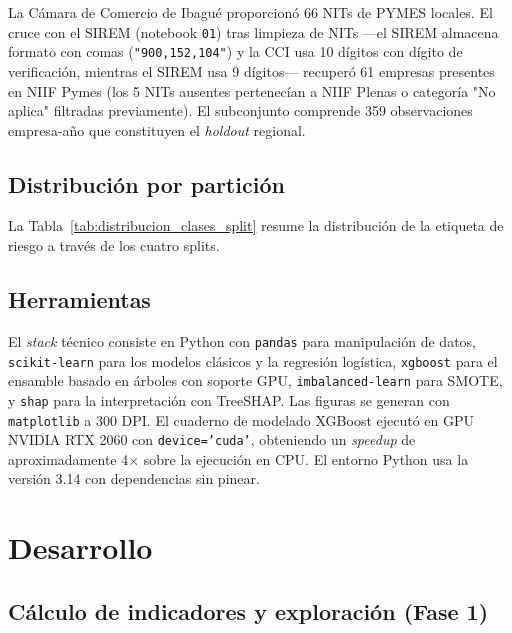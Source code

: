 \documentclass[12pt, letterpaper]{article}
\begin{document}
La C\'amara de Comercio de Ibagu\'e proporcion\'o 66 NITs de PYMES locales. El cruce con el SIREM (notebook \texttt{01}) tras limpieza de NITs ---el SIREM almacena formato con comas (\texttt{"900,152,104"}) y la CCI usa 10 d\'igitos con d\'igito de verificaci\'on, mientras el SIREM usa 9 d\'igitos--- recuper\'o 61 empresas presentes en NIIF Pymes (los 5 NITs ausentes pertenec\'ian a NIIF Plenas o categor\'ia "No aplica" filtradas previamente). El subconjunto comprende 359 observaciones empresa-a\~no que constituyen el \textit{holdout} regional.

\subsection{Distribuci\'on por partici\'on}

La Tabla~\ref{tab:distribucion_clases_split} resume la distribuci\'on de la etiqueta de riesgo a trav\'es de los cuatro splits.



\subsection{Herramientas}

El \textit{stack} t\'ecnico consiste en Python con \texttt{pandas} para manipulaci\'on de datos, \texttt{scikit-learn} para los modelos cl\'asicos y la regresi\'on log\'istica, \texttt{xgboost} para el ensamble basado en \'arboles con soporte GPU, \texttt{imbalanced-learn} para SMOTE, y \texttt{shap} para la interpretaci\'on con TreeSHAP. Las figuras se generan con \texttt{matplotlib} a 300 DPI. El cuaderno de modelado XGBoost ejecut\'o en GPU NVIDIA RTX 2060 con \texttt{device='cuda'}, obteniendo un \textit{speedup} de aproximadamente 4$\times$ sobre la ejecuci\'on en CPU. El entorno Python usa la versi\'on 3.14 con dependencias sin pinear.

\section{Desarrollo}
\label{sec:desarrollo}

\subsection{C\'alculo de indicadores y exploraci\'on (Fase 1)}
\label{sec:dev-indicadores}
\end{document}
